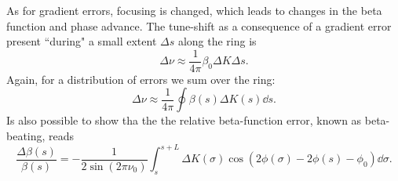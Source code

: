 

    As for gradient errors, focusing is changed, which leads to changes in the beta function and phase advance. The tune-shift as a consequence of a gradient error present ``during" a small extent $\Delta s$ along the ring is
         \begin{equation}
        \Delta \nu \approx \frac{1}{4\pi} \beta_0 \Delta K \Delta s.
        \label{eq:delta_nu}
     \end{equation}
     Again, for a distribution of errors we sum over the ring:
     \begin{equation}
        \Delta \nu \approx \frac{1}{4\pi}\oint \beta(s) \Delta K(s) \dd s.
        \label{eq:delta_nu_dist}
    \end{equation}
    Is also possible to show tha the the relative beta-function error, known as beta-beating, reads
     \begin{equation}
        \frac{\Delta \beta(s)}{\beta(s)} = - \frac{1}{2\sin(2\pi\nu_0)}\int_{s}^{s+L}\Delta K(\sigma)\cos(2\phi(\sigma)-2\phi(s)-\phi_0)\dd\sigma.
        \label{eq:beta_beat}
     \end{equation}
